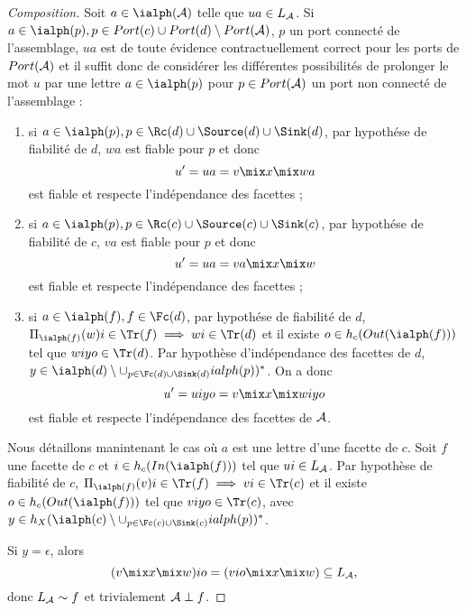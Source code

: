\begin{proof}[Composition]
    Soit $a\in \ialph({\cal A})$  telle que $ua\in
    L_{\cal A}$. Si $a\in \ialph(p), p\in Port(c)\cup Port(d)\setminus
    Port({\cal A})$, $p$ un port connect\'e de l'assemblage, $ua$ est
    de toute \'evidence contractuellement correct pour les ports de
    $Port({\cal A})$ et il
    suffit donc de consid\'erer les diff\'erentes possibilit\'es de prolonger le
    mot $u$ par une lettre $a\in \ialph(p)$ pour $p\in Port({\cal A})$
    un port non connect\'e de l'assemblage :
    \begin{enumerate}
      \item si $a\in \ialph(p), p\in \Rc(d)\cup \Source(d)\cup \Sink(d)$, par hypoth\'ese de
        fiabilit\'e de $d$, $wa$ est fiable pour $p$ et donc 
        $$
        u'=ua = v\mix x \mix wa
        $$
        est fiable et respecte l'ind\'ependance des facettes ;
      \item si $a\in \ialph(p), p\in \Rc(c)\cup \Source(c)\cup \Sink(c)$, par hypoth\'ese de
        fiabilit\'e de $c$, $va$ est fiable pour $p$ et donc 
        $$
        u'=ua = va\mix x \mix w
        $$
        est fiable et respecte l'ind\'ependance des facettes ;
      \item si $a\in \ialph(f), f\in \Fc(d)$, par hypoth\'ese de
        fiabilit\'e de $d$, $\Pi_{\ialph(f)}(w)i \in \Tr(f) \implies wi \in \Tr(d)$ et il existe $o\in h_c(Out(\ialph(f)))$ tel que
        $wiyo\in \Tr(d)$. Par hypoth\`ese d'ind\'ependance des facettes
        de $d$, $y\in \ialph(d)\setminus
        \cup_{p\in \Fc(d)\cup \Sink(d)}ialph(p))^*$. On a donc  
        $$
        u'= uiyo = v\mix x \mix wiyo
        $$
        est fiable et respecte l'ind\'ependance des facettes de ${\cal A}$.
    \end{enumerate}

    Nous d\'etaillons manintenant le cas o\`u $a$ est une lettre
    d'une facette de $c$.
    Soit $f$ une facette de $c$ et $i\in h_c(In(\ialph(f)))$ tel que
    $ui\in L_{\cal A}$. Par hypoth\`ese de fiabilit\'e de $c$,
    $\Pi_{\ialph(f)}(v)i \in \Tr(f) \implies vi \in \Tr(c)$ et il existe $o\in h_c(Out(\ialph(f)))$ tel que
    $viyo\in \Tr(c)$, avec $y\in h_X(\ialph(c)\setminus
    \cup_{p\in \Fc(c)\cup \Sink(c)}ialph(p))^*$. 
    
    Si $y=\epsilon$, alors 
    $$
    (v \mix x \mix w)io = (vio \mix x \mix w) \subseteq L_{\cal A},
    $$
    donc $L_{\cal A} \sim f$ et trivialement ${\cal A}\perp f$. 
    

\end{proof}
